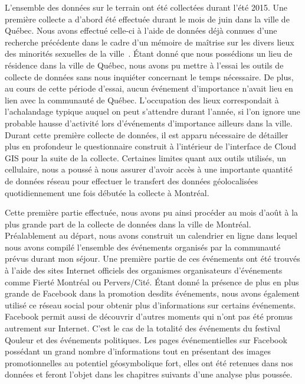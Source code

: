 L'ensemble des données sur le terrain ont été collectées durant l'été 2015.
Une première collecte a d'abord été effectuée durant le mois de juin dans la ville de Québec.
Nous avons effectué celle-ci à l'aide de données déjà connues d'une recherche précédente dans le cadre d'un mémoire de maîtrise sur les divers lieux des minorités sexuelles de la ville~\citep{Vachon2014}.
Étant donné que nous possédions un lieu de résidence dans la ville de Québec, nous avons pu mettre à l'essai les outils de collecte de données sans nous inquiéter concernant le temps nécessaire.
De plus, au cours de cette période d'essai, aucun événement d'importance n'avait lieu en lien avec la communauté \lgbt{} de Québec.
L'occupation des lieux correspondait à l'achalandage typique auquel on peut s'attendre durant l'année, si l'on ignore une probable hausse d'activité lors d'événements d'importance ailleurs dans la ville.
Durant cette première collecte de données, il est apparu nécessaire de détailler plus en profondeur le questionnaire construit à l'intérieur de l'interface de Cloud GIS pour la suite de la collecte.
Certaines limites quant aux outils utilisés, un cellulaire, nous a poussé à nous assurer d'avoir accès à une importante quantité de données réseau pour effectuer le transfert des données géolocalisées quotidiennement une fois débutée la collecte à Montréal.

Cette première partie effectuée, nous avons pu ainsi procéder au mois d'août à la plus grande part de la collecte de données dans la ville de Montréal.
Préalablement au départ, nous avons construit un calendrier en ligne dans lequel nous avons compilé l'ensemble des événements organisés par la communauté \lgbt{} prévus durant mon séjour.
Une première partie de ces événements ont été trouvés à l'aide des sites Internet officiels des organismes organisateurs d'événements comme Fierté Montréal ou Pervers/Cité.
Étant donné la présence de plus en plus grande de Facebook dans la promotion desdits événements, nous avons également utilisé ce réseau social pour obtenir plus d'informations sur certains événements.
Facebook permit aussi de découvrir d'autres moments qui n'ont pas été promus autrement sur Internet.
C'est le cas de la totalité des événements du festival Qouleur et des événements politiques.
Les pages événementielles sur Facebook possédant un grand nombre d'informations tout en présentant des images promotionnelles au potentiel géosymbolique fort, elles ont été retenues dans nos données et feront l'objet dans les chapitres suivants d'une analyse plus poussée.

